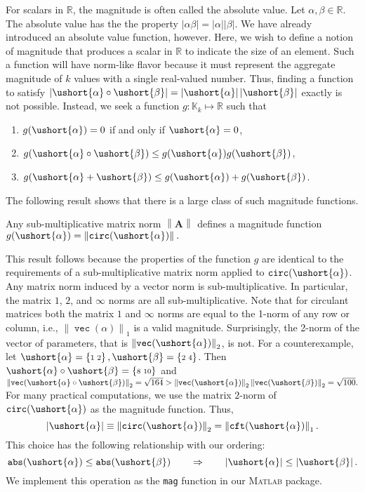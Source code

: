 \documentclass[1p,authoryear,letterpaper]{elsarticle}
\DeclareMathOperator{\tcirc}{\texttt{circ}}
\DeclareMathOperator{\tabs}{\texttt{abs}}
\DeclareMathOperator{\tvec}{\texttt{vec}}
\providecommand{\eqdef}{\equiv}
\providecommand{\RR}{\mathbb{R}}
\providecommand{\KK}{\mathbb{K}}
\providecommand{\normof}[2][]{\left\| #2 \right\|_{#1}}\providecommand{\nnormof}[2][]{\| #2 \|_{#1}}\providecommand{\itr}[2]{#1^{(#2)}}
\providecommand{\absof}[1]{\left| #1 \right|}
\providecommand{\mat}{\boldsymbol}
\providecommand{\mA}{\ensuremath{\mat{A}}}
\DeclareMathOperator{\cft}{\texttt{cft}}
\newcommand{\cel}[1]{\ushort{#1}}
\newcommand{\csbmat}[1]{\left\{\! \begin{smallmatrix} #1
\end{smallmatrix} \! \right\}}
\newcommand{\calpha}{\ensuremath{\cel{\alpha}}}
\newcommand{\cbeta}{\ensuremath{\cel{\beta}}}
\newcommand{\Matlab}{\textsc{Matlab}\xspace}
\begin{document}
For scalars in $\RR$, the
magnitude is often called the absolute value.
Let $\alpha, \beta \in \RR$.  The absolute value
has the the property $\absof{\alpha \beta} = \absof{\alpha} \absof{\beta}$.
We have already introduced an absolute value function,
however.  Here, we wish to define a notion of magnitude that
produces a scalar in $\RR$ to indicate the size of an
element.  Such a function will have norm-like flavor because
it must represent the aggregate magnitude of $k$ values with
a single real-valued number.  Thus, finding a function to satisfy
$\absof{\calpha \circ \cbeta} = \absof{\calpha} \absof{\cbeta}$
exactly is not possible.  Instead, we seek a
function $g : \KK_k \mapsto \RR $ such that
\begin{enumerate}
 \item $g(\calpha) = 0$ if and only if $\calpha = 0$,
 \item $g(\calpha \circ \cbeta) \le g(\calpha) g(\cbeta)$,
 \item $g(\calpha + \cbeta) \le g(\calpha) + g(\cbeta)$.
\end{enumerate}
The following result shows that there is a large class of
such magnitude functions.

\begin{result}
 Any sub-multiplicative matrix norm $\normof{\mA}$ defines a magnitude
 function $ g(\calpha) = \normof{\tcirc(\calpha)}. $
\end{result}

This result follows because the properties of the function
$g$ are identical to the requirements of a sub-multiplicative
matrix norm applied to $\tcirc(\calpha)$.
Any matrix norm induced by a vector norm is sub-multiplicative.
In particular, the matrix $1$, $2$, and $\infty$ norms are
all sub-multiplicative.
Note that for circulant matrices
both the matrix $1$ and $\infty$ norms are equal to the 1-norm
of any row or column, i.e., $\normof[1]{\tvec(\alpha)}$ is a valid
magnitude.  Surprisingly, the 2-norm of the vector of parameters,
that is $\normof[2]{\tvec(\calpha)}$, is not.  For a counterexample,
let $\calpha = \csbmat{ 1 & 2 }, \cbeta = \csbmat{ 2 & 4 }$.  Then
$\calpha \circ \cbeta = \csbmat{ 8 & 10 }$ and
$\normof[2]{\tvec(\calpha \circ \cbeta)} = \sqrt{164} >
\normof[2]{\tvec(\calpha)} \normof[2]{\tvec(\cbeta)} = \sqrt{100}.$
For many practical computations, we use the matrix $2$-norm
of $\tcirc(\calpha)$ as the magnitude function.  Thus,
\[ \absof{\calpha} \eqdef \normof[2]{\tcirc(\calpha)} = \normof[1]{\cft(\calpha)}. \]
This choice has the following relationship with our ordering:
\[ \tabs(\calpha) \le \tabs(\cbeta) \qquad  \Rightarrow \qquad \absof{\calpha} \le \absof{\cbeta}. \]
We implement this operation as the \texttt{mag} function
in our \Matlab package.
\end{document}
